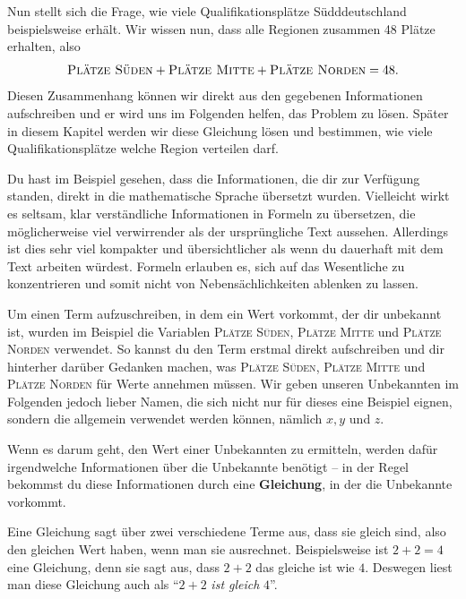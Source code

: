 \documentclass[../../main.tex]{subfiles}
\begin{document}
\begin{example}
    Nun stellt sich die Frage, wie viele Qualifikationsplätze Südddeutschland beispielsweise erhält. Wir wissen nun, dass alle Regionen zusammen 48 Plätze erhalten, also
    \[\textsc{Plätze Süden}+\textsc{Plätze Mitte}+\textsc{Plätze Norden}=48.\]
    Diesen Zusammenhang können wir direkt aus den gegebenen Informationen aufschreiben und er wird uns im Folgenden helfen, das Problem zu lösen. Später in diesem Kapitel werden wir diese Gleichung lösen und bestimmen, wie viele Qualifikationsplätze welche Region verteilen darf.
\end{example}

Du hast im Beispiel gesehen, dass die Informationen, die dir zur Verfügung standen, direkt in die mathematische Sprache übersetzt wurden. Vielleicht wirkt es seltsam, klar verständliche Informationen in Formeln zu übersetzen, die möglicherweise viel verwirrender als der ursprüngliche Text aussehen. Allerdings ist dies sehr viel kompakter und übersichtlicher als wenn du dauerhaft mit dem Text arbeiten würdest. Formeln erlauben es, sich auf das Wesentliche zu konzentrieren und somit nicht von Nebensächlichkeiten ablenken zu lassen.

Um einen Term aufzuschreiben, in dem ein Wert vorkommt, der dir unbekannt ist, wurden im Beispiel die Variablen \textsc{Plätze Süden}, \textsc{Plätze Mitte} und \textsc{Plätze Norden} verwendet. So kannst du den Term erstmal direkt aufschreiben und dir hinterher darüber Gedanken machen, was \textsc{Plätze Süden}, \textsc{Plätze Mitte} und \textsc{Plätze Norden} für Werte annehmen müssen. Wir geben unseren Unbekannten im Folgenden jedoch lieber Namen, die sich nicht nur für dieses eine Beispiel eignen, sondern die allgemein verwendet werden können, nämlich $x, y$ und $z$.

Wenn es darum geht, den Wert einer Unbekannten zu ermitteln, werden dafür irgendwelche Informationen über die Unbekannte benötigt -- in der Regel bekommst du diese Informationen durch eine \textbf{Gleichung}, in der die Unbekannte vorkommt.

Eine Gleichung sagt über zwei verschiedene Terme aus, dass sie gleich sind, also den gleichen Wert haben, wenn man sie ausrechnet. Beispielsweise ist $2+2=4$ eine Gleichung, denn sie sagt aus, dass $2+2$ das gleiche ist wie $4$. Deswegen liest man diese Gleichung auch als \enquote{$2+2$ \emph{ist gleich} $4$}.
\end{document}
